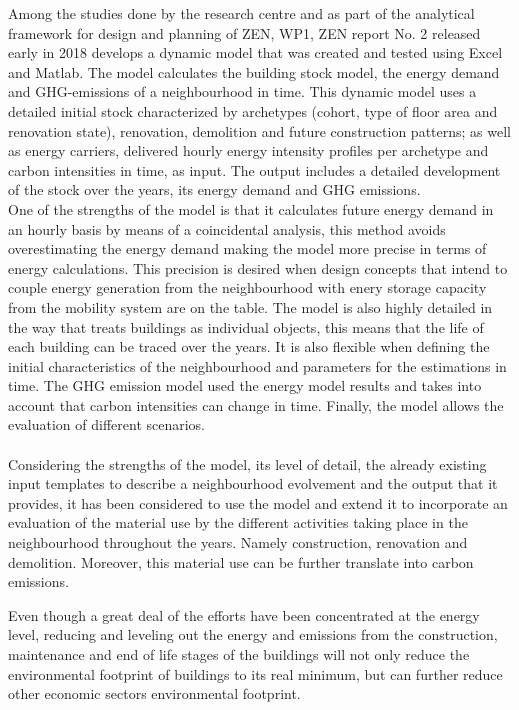 Among the studies done by the research centre and as part of the analytical framework for design and planning of ZEN, WP1, ZEN report No. 2 \cite{ZENJan} released early in 2018 develops a dynamic model that was created and tested using Excel and Matlab. The model calculates the building stock model, the energy demand and GHG-emissions of a neighbourhood in time. This dynamic model uses a detailed initial stock characterized by archetypes (cohort, type of floor area and renovation state), renovation, demolition and future construction patterns; as well as energy carriers, delivered hourly energy intensity profiles per archetype and carbon intensities in time, as input. The output includes a detailed development of the stock over the years, its energy demand and GHG emissions. \\

One of the strengths of the model is that it calculates future energy demand in an hourly basis by means of a coincidental analysis, this method avoids overestimating the energy demand making the model more precise in terms of energy calculations. This precision is desired when design concepts that intend to couple energy generation from the neighbourhood with enery storage capacity from the mobility system are on the table. The model is also highly detailed in the way that treats buildings as individual objects, this means that the life of each building can be traced over the years. It is also flexible when defining the initial characteristics of the neighbourhood and parameters for the estimations in time. The GHG emission model used the energy model results and takes into account that carbon intensities can change in time. Finally, the model allows the evaluation of different scenarios.\\

\\
Considering the strengths of the model, its level of detail, the already existing input templates to describe a neighbourhood evolvement and the output that it provides, it has been considered to use the model and extend it to incorporate an evaluation of the material use by the different activities taking place in the neighbourhood throughout the years. Namely construction, renovation and demolition. Moreover, this material use can be further translate into carbon emissions.

Even though a great deal of the efforts have been concentrated at the energy level, reducing and leveling out the energy and emissions from the construction, maintenance and end of life stages of the buildings will not only reduce the environmental footprint of  buildings to its real minimum, but can further reduce other economic sectors environmental footprint. 

